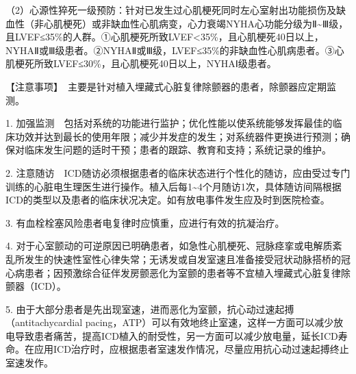 （2）心源性猝死一级预防：针对已发生过心肌梗死同时左心室射出功能损伤及缺血性（非心肌梗死）或非缺血性心肌病变，心力衰竭NYHA心功能分级为Ⅱ\textasciitilde{}Ⅲ级，且LVEF≤35\%的人群。①心肌梗死所致LVEF\textless{}35\%，且心肌梗死40日以上，NYHAⅡ或Ⅲ级患者。②NYHAⅡ或Ⅲ级，LVEF≤35\%的非缺血性心肌病患者。③心肌梗死所致LVEF≤30\%，且心肌梗死40日以上，NYHAⅠ级患者。

【注意事项】　主要是针对植入埋藏式心脏复律除颤器的患者，除颤器应定期监测。

1.
加强监测　包括对系统的功能进行监护；优化性能以使系统能够发挥最佳的临床功效并达到最长的使用年限；减少并发症的发生；对系统器件更换进行预测；确保对临床发生问题的适时干预；患者的跟踪、教育和支持；系统记录的维护。

2.
注意随访　ICD随访必须根据患者的临床状态进行个性化的随访，应由受过专门训练的心脏电生理医生进行操作。植入后每1\textasciitilde{}4个月随访1次，具体随访间隔根据ICD的类型以及患者的临床状况决定。如有放电事件发生应及时到医院检查。

3. 有血栓栓塞风险患者电复律时应慎重，应进行有效的抗凝治疗。

4.
对于心室颤动的可逆原因已明确患者，如急性心肌梗死、冠脉痉挛或电解质紊乱所发生的快速性室性心律失常；无诱发或自发室速且准备接受冠状动脉搭桥的冠心病患者；因预激综合征伴发房颤恶化为室颤的患者等不宜植入埋藏式心脏复律除颤器（ICD）。

5.
由于大部分患者是先出现室速，进而恶化为室颤，抗心动过速起搏（antitachycardial
pacing，ATP）可以有效地终止室速，这样一方面可以减少放电导致患者痛苦，提高ICD植入的耐受性，另一方面可以减少放电量，延长ICD寿命。在应用ICD治疗时，应根据患者室速发作情况，尽量应用抗心动过速起搏终止室速发作。